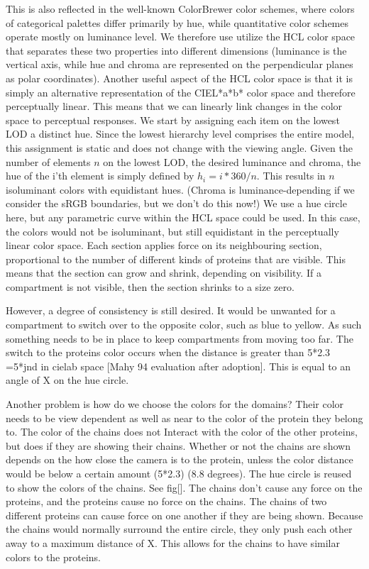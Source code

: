 \documentclass[review,journal]{vgtc}         %
\begin{document}
This is also reflected in the well-known ColorBrewer color schemes, where colors of categorical palettes differ primarily by hue, while quantitative color schemes operate mostly on luminance level.  
We therefore use utilize the HCL color space that separates these two properties into different dimensions (luminance is the vertical axis, while hue and chroma are represented on the perpendicular planes as polar coordinates). 
Another useful aspect of the HCL color space is that it is simply an alternative representation of the CIEL*a*b* color space and therefore perceptually linear. 
This means that we can linearly link changes in the color space to perceptual responses. 
We start by assigning each item on the lowest LOD a distinct hue. 
Since the lowest hierarchy level comprises the entire model, this assignment is static and does not change with the viewing angle. 
Given the number of elements $n$ on the lowest LOD, the desired luminance and chroma, the hue of the i’th element is simply defined by $h_i=i*360/n$. 
This results in $n$ isoluminant colors with equidistant hues. 
(Chroma is luminance-depending if we consider the sRGB boundaries, but we don’t do this now!)
We use a hue circle here, but any parametric curve within the HCL space could be used. 
In this case, the colors would not be isoluminant, but still equidistant in the perceptually linear color space. 
Each section applies force on its neighbouring section, proportional to the number of different kinds of proteins that are visible. 
This means that the section can grow and shrink, depending on visibility. If a compartment is not visible, then the section shrinks to a size zero. 

However, a degree of consistency is still desired. It would be unwanted for a compartment to switch over to the opposite color, such as blue to yellow.  
As such something needs to be in place to keep compartments from moving too far.
The switch to the proteins color occurs when the distance is greater than 5*2.3 =5*jnd in cielab space [Mahy 94 evaluation after adoption]. 
This is equal to an angle of X on the hue circle.

Another problem is how do we choose the colors for the domains? Their color needs to be view dependent as well as near to the color of the protein they belong to. 
The color of the chains does not Interact with the color of the other proteins, but does if they are showing their chains. 
Whether or not the chains are shown depends on the how close the camera is to the protein, unless the color distance would be below a certain amount (5*2.3) (8.8 degrees). 
The hue circle is reused to show the colors of the chains. See fig[]. 
The chains don’t cause any force on the proteins, and the proteins cause no force on the chains. 
The chains of two different proteins can cause force on one another if they are being shown. 
Because the chains would normally surround the entire circle, they only push each other away to a maximum distance of X. 
This allows for the chains to have similar colors to the proteins.
\end{document}
